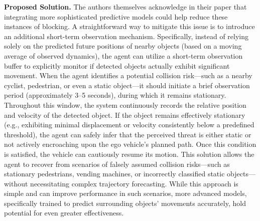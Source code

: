 \noindent\textbf{Proposed Solution.} The authors themselves acknowledge in their paper that integrating more sophisticated predictive models could help reduce these instances of blocking. A straightforward way to mitigate this issue is to introduce an additional short-term observation mechanism. Specifically, instead of relying solely on the predicted future positions of nearby objects (based on a moving average of observed dynamics), the agent can utilize a short-term observation buffer to explicitly monitor if detected objects actually exhibit significant movement. When the agent identifies a potential collision risk—such as a nearby cyclist, pedestrian, or even a static object—it should initiate a brief observation period (approximately 3–5 seconds), during which it remains stationary. Throughout this window, the system continuously records the relative position and velocity of the detected object. If the object remains effectively stationary (e.g., exhibiting minimal displacement or velocity consistently below a predefined threshold), the agent can safely infer that the perceived threat is either static or not actively encroaching upon the ego vehicle’s planned path. Once this condition is satisfied, the vehicle can cautiously resume its motion. This solution allows the agent to recover from scenarios of falsely assumed collision risks—such as stationary pedestrians, vending machines, or incorrectly classified static objects—without necessitating complex trajectory forecasting. While this approach is simple and can improve performance in such scenarios, more advanced models, specifically trained to predict surrounding objects' movements accurately, hold potential for even greater effectiveness.


